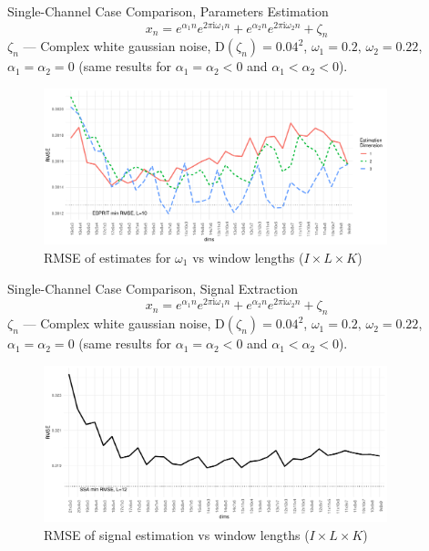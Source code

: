 \documentclass[pdf, unicode, ucs, notheorems]{beamer}
\theoremstyle{definition}
\begin{document}
\begin{frame}{Single-Channel Case Comparison, Parameters Estimation}
  \vspace*{-0.3cm}
  \[
    x_{n} = e^{ \alpha_1 n } e^{2 \pi\mathrm{i} \omega_1 n} +
    e^{ \alpha_2 n } e^{ 2 \pi  \mathrm{i}\omega_2 n} + \zeta_n
  \]
  $\zeta_n$ --- Complex white gaussian noise, $\mathrm{D}(\zeta_n) =
  0.04^2$, $\omega_1 = 0.2,\, \omega_2 = 0.22$, $\alpha_1=\alpha_2=0$
  (same results for $\alpha_1=\alpha_2 < 0$ and $\alpha_1 < \alpha_2 < 0$).

  \begin{figure}
    \centering
    \includegraphics[width=0.89\textwidth]{img/freq1_dims_no_rates.pdf}
    \caption{RMSE of estimates for $\omega_1$ vs window lengths
    ($I\times L \times K$)}
  \end{figure}
\end{frame}

\begin{frame}{Single-Channel Case Comparison, Signal Extraction}
  \vspace*{-0.3cm}
  \[
    x_{n} = e^{ \alpha_1 n } e^{2 \pi\mathrm{i} \omega_1 n} +
    e^{ \alpha_2 n } e^{ 2 \pi  \mathrm{i}\omega_2 n} + \zeta_n
  \]
  $\zeta_n$ --- Complex white gaussian noise,
  $\mathrm{D}(\zeta_n) = 0.04^2$, $\omega_1 = 0.2,\,
  \omega_2 = 0.22$, $\alpha_1=\alpha_2=0$ (same results for
  $\alpha_1=\alpha_2 < 0$ and $\alpha_1 < \alpha_2 < 0$).

  \begin{figure}
    \centering
    \includegraphics[width=0.89\textwidth]{img/rec_dim_rmse_no_rates.pdf}
    \caption{RMSE of signal estimation vs window lengths
    ($I\times L \times K$)}
  \end{figure}
\end{frame}
\end{document}
